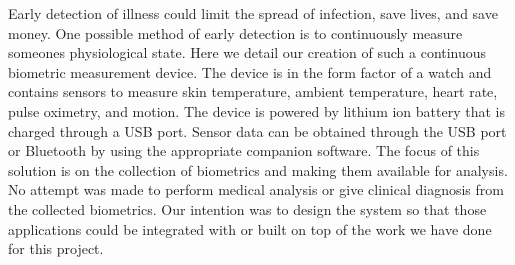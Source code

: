 Early detection of illness could limit the spread of infection, save lives, and
save money.  One possible method of early detection is to continuously measure
someones physiological state.  Here we detail our creation of such a continuous
biometric measurement device.  The device is in the form factor of a watch and
contains sensors to measure skin temperature, ambient temperature, heart rate,
pulse oximetry, and motion.  The device is powered by lithium ion battery that
is charged through a USB port.  Sensor data can be obtained through the USB
port or Bluetooth by using the appropriate companion software.  The focus of
this solution is on the collection of biometrics and making them available for
analysis.  No attempt was made to perform medical analysis or give clinical
diagnosis from the collected biometrics.  Our intention was to design the
system so that those applications could be integrated with or built on top of
the work we have done for this project.
